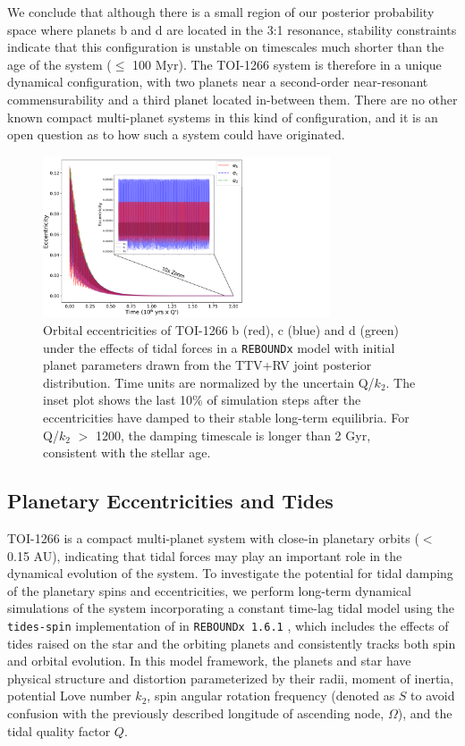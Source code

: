 \documentclass[twocolumn]{aastex631}
\begin{document}
We conclude that although there is a small region of our posterior probability space where planets b and d are located in the 3:1 resonance, stability constraints indicate that this configuration is unstable on timescales much shorter than the age of the system ($\leq$ 100 Myr). The TOI-1266 system is therefore in a unique dynamical configuration, with two planets near a second-order near-resonant commensurability and a third planet located in-between them. There are no other known compact multi-planet systems in this kind of configuration, and it is an open question as to how such a system could have originated.

\begin{figure}
  \includegraphics[width=8.5cm]{Ecc_Damping_FiginFig.pdf}
  \caption{Orbital eccentricities of TOI-1266 b (red), c (blue) and d (green) under the effects of tidal forces in a \texttt{REBOUNDx} model with initial planet parameters drawn from the TTV+RV joint posterior distribution. Time units are normalized by the uncertain Q/$k_2$. The inset plot shows the last 10\% of simulation steps after the eccentricities have damped to their stable long-term equilibria. For Q/$k_2$ $>$ 1200, the damping timescale is longer than 2 Gyr, consistent with the stellar age.}
  \label{fig:ecc damping plot}
\end{figure}

\subsection{Planetary Eccentricities and Tides}  \label{sec:eccs and tides}

TOI-1266 is a compact multi-planet system with close-in planetary orbits ($<$ 0.15 AU), indicating that tidal forces may play an important role in the dynamical evolution of the system. To investigate the potential for tidal damping of the planetary spins and eccentricities, we perform long-term dynamical simulations of the system incorporating a constant time-lag tidal model \citep{Eggleton1998} using the \texttt{tides-spin} implementation of \cite{Lu_2023} in \texttt{REBOUNDx 1.6.1} \citep{Tamayo2020}, which includes the effects of tides raised on the star and the orbiting planets and consistently tracks both spin and orbital evolution. In this model framework, the planets and star have physical structure and distortion parameterized by their radii, moment of inertia, potential Love number $k_2$, spin angular rotation frequency (denoted as $S$ to avoid confusion with the previously described longitude of ascending node, $\Omega$), and the tidal quality factor $Q$. 
\end{document}
